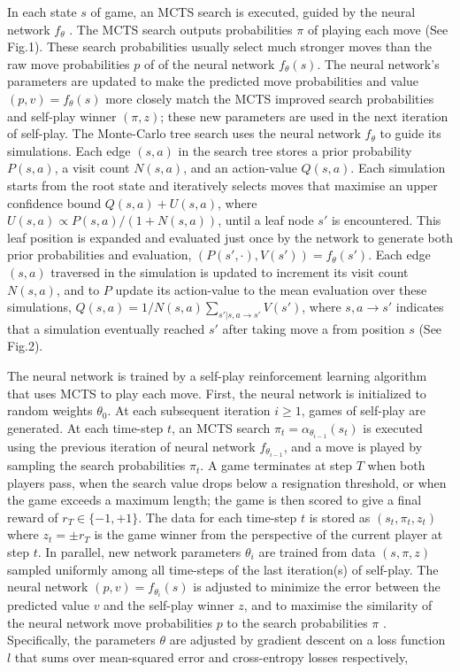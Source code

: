 \documentclass[12pt,a4paper]{article}
\begin{document}
In each state \(s\) of game, an MCTS search is executed, guided by the neural network \(f_\theta\) . The MCTS search outputs probabilities \(\pi\) of playing each move (See Fig.1). These search probabilities usually select much stronger moves than the raw move probabilities \(p\) of of the neural network \(f_\theta(s)\). The neural network’s parameters are updated to make the predicted move probabilities and value \((p, v) = f_\theta(s)\) more closely match the MCTS improved search probabilities and self-play winner \((\pi, z)\); these new parameters are used in the next iteration of self-play. The Monte-Carlo tree search uses the neural network \(f_\theta\) to guide its simulations. Each edge \((s, a)\) in the search tree stores a prior probability \(P(s, a)\), a visit count \(N(s, a)\), and an action-value \(Q(s, a)\). Each simulation starts from the root state and iteratively selects moves that maximise an upper confidence bound \(Q(s, a) + U(s, a)\), where \(U(s, a) \propto P(s, a)/(1 + N(s, a))\)\cite{AlphaGo}, until a leaf node \(s'\) is encountered. This leaf position is expanded and evaluated just once by the network to generate both prior probabilities and evaluation, \((P(s', ·), V(s')) = f_θ (s')\). Each edge \((s, a)\) traversed in the simulation is updated to increment its visit count \(N(s, a)\), and to \(P\) update its action-value to the mean evaluation over these simulations, \(Q(s, a) = 1/N(s, a) \sum_{s'|s,a\to s'}V(s')\), where \(s,a\to s'\) indicates that a simulation eventually reached \(s'\) after taking move a from position \(s\) (See Fig.2).\par
The neural network is trained by a self-play reinforcement learning algorithm that uses MCTS to play each move. First, the neural network is initialized to random weights \(\theta_0\). At each subsequent iteration \(i \geq 1\), games of self-play are generated. At each time-step \(t\), an MCTS search \(\pi_t = \alpha_{\theta_{i−1}}(s_t)\) is executed using the previous iteration of neural network \(f_{\theta_{i−1}}\), and a move is played by sampling the search probabilities \(\pi_t\). A game terminates at step \(T\) when both players pass, when the search value drops below a resignation threshold, or when the game exceeds a maximum length; the game is then scored to give a final reward of \(r_T \in \{−1, +1\}\). The data for each time-step \(t\) is stored as \((s_t, \pi_t, z_t)\) where \(z_t = \pm r_T\) is the game winner from the perspective of the current player at step \(t\). In parallel, new network parameters \(\theta_i\) are trained from data \((s, \pi, z)\) sampled uniformly among all time-steps of the last iteration(s) of self-play. The neural network \((p, v) = f_{\theta_i}(s)\) is adjusted to minimize the error between the predicted value \(v\) and the self-play winner \(z\), and to maximise the similarity of the neural network move probabilities \(p\) to the search probabilities \(\pi\) . Specifically, the parameters \(\theta\) are adjusted by gradient descent on a loss function \(l\) that sums over mean-squared error and cross-entropy losses respectively,\par
\end{document}
